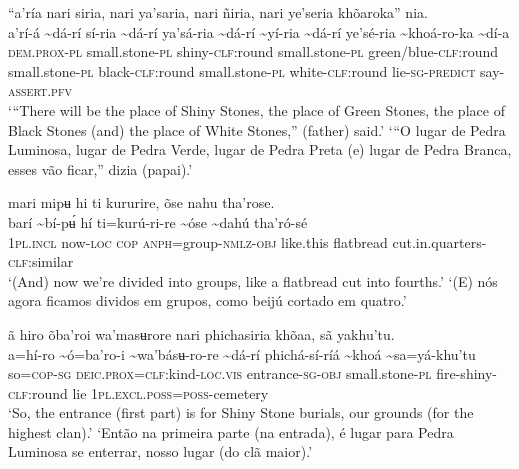 \documentclass[output=paper,
modfonts,nonflat
]{langsci/langscibook}
\begin{document}
\ea “a’ría nari siria, nari ya'saria, nari ñiria, nari ye'seria khõaroka” nia. \\[.3em]
\gll a’rí-á	{\textasciitilde}dá-rí	sí-ria	{\textasciitilde}dá-rí	ya'sá-ria {\textasciitilde}dá-rí	{\textasciitilde}yí-ria	{\textasciitilde}dá-rí	ye'sé-ria	{\textasciitilde}khoá-ro-ka	{\textasciitilde}dí-a\\
     \textsc{dem.prox-pl}	small.stone\textsc{-pl}	shiny-\textsc{clf:}round	small.stone\textsc{-pl}	green/blue-\textsc{clf:}round small.stone\textsc{-pl}	black-\textsc{clf:}round	small.stone\textsc{-pl}	white-\textsc{clf:}round	lie\textsc{-sg-predict}	say-\textsc{assert.pfv}\\
\glt ‘“There will be the place of Shiny Stones, the place of Green Stones, the place of Black Stones (and) the place of White Stones,” (father) said.’
\glt ‘“O lugar de Pedra Luminosa, lugar de Pedra Verde, lugar de Pedra Preta (e) lugar de Pedra Branca, esses vão ficar,” dizia (papai).’
\z 

\ea mari mipʉ hi ti kururire, õse nahu tha'rose. \\[.3em]
\gll {\textasciitilde}barí	{\textasciitilde}bí-pʉ́	hí	ti=kurú-ri-re	{\textasciitilde}óse	{\textasciitilde}dahú	tha'ró-sé \\
     1\textsc{pl.incl}	now\textsc{-loc}	\textsc{cop}	\textsc{anph}=group\textsc{-nmlz-obj}	like.this	flatbread	cut.in.quarters-\textsc{clf:}similar\\
\glt ‘(And) now we're divided into groups, like a flatbread cut into fourths.’
\glt ‘(E) nós agora ficamos dividos em grupos, como beijú cortado em quatro.’
\z 

 
\ea ã hiro õba'roi wa'masʉrore nari phichasiria khõaa, sã yakhu'tu. \\[.3em]
\gll {\textasciitilde}a=hí-ro	{\textasciitilde}ó=ba'ro-i	{\textasciitilde}wa'básʉ-ro-re {\textasciitilde}dá-rí	phichá-sí-ríá	{\textasciitilde}khoá	{\textasciitilde}sa=yá-khu'tu\\
     so=\textsc{cop-sg}	\textsc{deic.prox=clf:}kind\textsc{-loc.vis}	entrance\textsc{-sg-obj} small.stone\textsc{-pl}	fire-shiny-\textsc{clf:}round	lie	1\textsc{pl.excl.poss=poss}-cemetery\\
\glt ‘So, the entrance (first part) is for Shiny Stone burials, our grounds (for the highest clan).’
\glt ‘Então na primeira parte (na entrada), é lugar para Pedra Luminosa se enterrar, nosso lugar (do clã maior).’
\z
\end{document}

